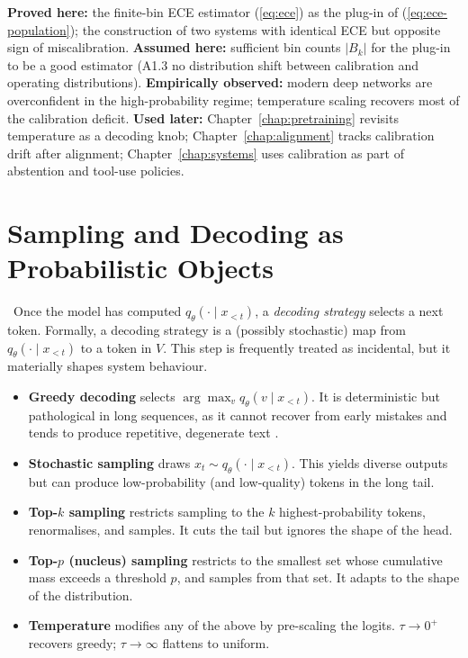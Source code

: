 \begin{provedassumed}
\textbf{Proved here:} the finite-bin ECE estimator (\ref{eq:ece}) as
the plug-in of (\ref{eq:ece-population}); the construction of two
systems with identical ECE but opposite sign of miscalibration.
\textbf{Assumed here:} sufficient bin counts $|B_k|$ for the plug-in
to be a good estimator (A1.3 no distribution shift between
calibration and operating distributions).
\textbf{Empirically observed:} modern deep networks are overconfident
in the high-probability regime; temperature scaling recovers most of
the calibration deficit.
\textbf{Used later:} Chapter~\ref{chap:pretraining} revisits temperature as a decoding knob;
Chapter~\ref{chap:alignment} tracks calibration drift after alignment; Chapter~\ref{chap:systems} uses
calibration as part of abstention and tool-use policies.
\end{provedassumed}

\section{Sampling and Decoding as Probabilistic Objects}

\Def\ Once the model has computed $q_\theta(\cdot \mid x_{<t})$, a
\emph{decoding strategy} selects a next token. Formally, a decoding
strategy is a (possibly stochastic) map from $q_\theta(\cdot \mid
x_{<t})$ to a token in $V$. This step is frequently treated as
incidental, but it materially shapes system behaviour.

\begin{itemize}
  \item \textbf{Greedy decoding} selects $\arg\max_v q_\theta(v \mid
  x_{<t})$. It is deterministic but pathological in long sequences, as
  it cannot recover from early mistakes and tends to produce repetitive,
  degenerate text \citep{holtzman2020curious}.
  \item \textbf{Stochastic sampling} draws $x_t \sim q_\theta(\cdot
  \mid x_{<t})$. This yields diverse outputs but can produce
  low-probability (and low-quality) tokens in the long tail.
  \item \textbf{Top-$k$ sampling} restricts sampling to the $k$
  highest-probability tokens, renormalises, and samples. It cuts the
  tail but ignores the shape of the head.
  \item \textbf{Top-$p$ (nucleus) sampling} restricts to the smallest
  set whose cumulative mass exceeds a threshold $p$, and samples from
  that set. It adapts to the shape of the distribution.
  \item \textbf{Temperature} modifies any of the above by pre-scaling
  the logits. $\tau \to 0^+$ recovers greedy; $\tau \to \infty$ flattens
  to uniform.
\end{itemize}

